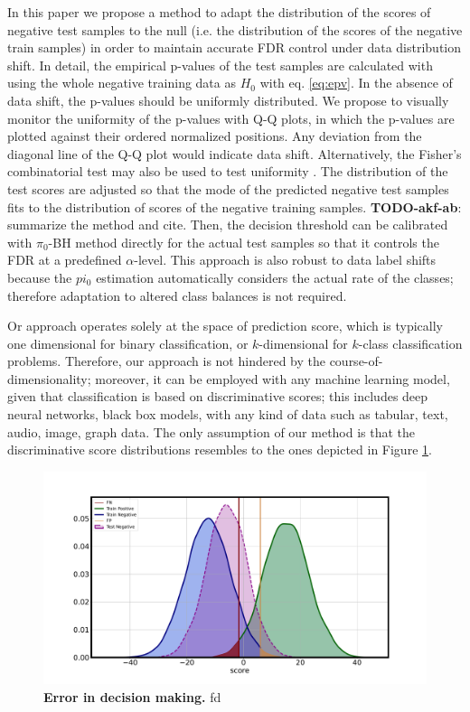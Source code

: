 \documentclass{article}
\newcommand{\todo}[2]{{\color{red} {\bf TODO-#1}: #2}}
\begin{document}


In this paper we propose a method to adapt the distribution of the scores of negative test samples to the null (i.e. the distribution of the scores of the negative train samples) in order to maintain accurate FDR control under data distribution shift. In detail, the empirical p-values of the test samples are calculated with using the whole negative training data as $H_0$ with eq. \ref{eq:epv}. In the absence of data shift, the p-values should be uniformly distributed. We propose to visually monitor the uniformity of the p-values with Q-Q plots, in which the p-values are plotted against their ordered normalized positions. Any deviation from the diagonal line of the Q-Q plot would indicate data shift. Alternatively, the Fisher's combinatorial test may also be used to test uniformity \cite{fisher1928statistical}. The distribution of the test scores are adjusted so that the mode of the predicted negative test samples fits to the distribution of scores of the negative training samples. \todo{akf-ab}{summarize the method and cite}. Then, the decision threshold can be calibrated with $\pi_0$-BH method directly for the actual test samples so that it controls the FDR at a predefined $\alpha$-level. This approach is also robust to data label shifts because the $pi_0$ estimation automatically considers the actual rate of the classes; therefore adaptation to altered class balances is not required.

 Or approach operates solely at the space of prediction score, which is typically one dimensional for binary classification, or $k$-dimensional for $k$-class classification problems. Therefore, our approach is not hindered by the course-of-dimensionality; moreover, it can be employed with any machine learning model, given that classification is based on discriminative scores; this includes deep neural networks, black box models, with any kind of data such as tabular, text, audio, image, graph data. The only assumption of our method is that the discriminative score distributions resembles to the ones depicted in Figure \ref{fig:illustration}.

\begin{figure}
	\centering
	\includegraphics[width=5in]{img/synthetic_overview.pdf}
	\caption{{\bf Error in decision making.} fd}
	\label{fig:illustration}
\end{figure}  
\end{document}
